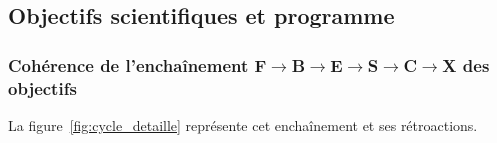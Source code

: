 \subsection{Objectifs scientifiques et programme}
\label{subsec:objectifs_programme}
\begin{sloppypar}

\subsubsection{Coh\'erence de l'encha\^inement \textbf{F}$\to$\textbf{B}$\to$\textbf{E}$\to$\textbf{S}$\to$\textbf{C}$\to$\textbf{X} des objectifs}
\label{subsubsec:cycle_FBESCX}

La figure~\ref{fig:cycle_detaille} repr\'esente cet encha\^inement et ses r\'etroactions.


\end{sloppypar}
